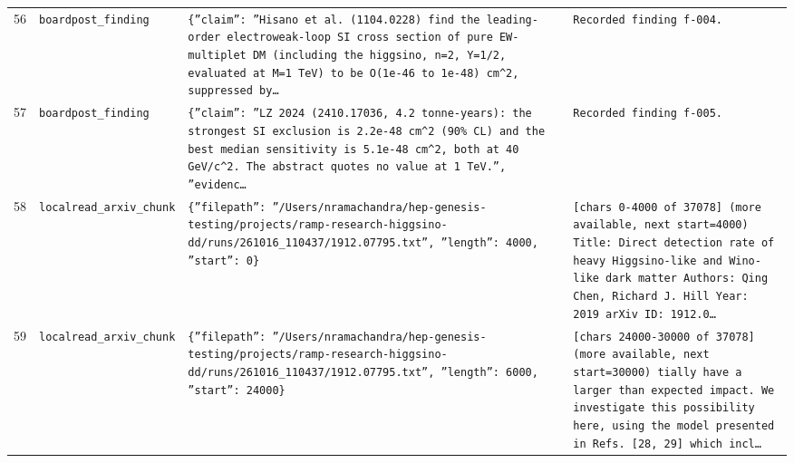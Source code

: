 \documentclass[11pt,a4paper]{article}
\begin{document}
\begin{longtable}{@{}p{}p{}p{}p{}@{}}
56 & \texttt{board}\newline\texttt{post\_\allowbreak{}finding} & \texttt{\{''claim'':\allowbreak{} ''Hisano et al. (1104.0228)\allowbreak{} find the leading-order electroweak-loop SI cross section of pure EW-multiplet DM (including the higgsino,\allowbreak{} n=\allowbreak{}2,\allowbreak{} Y=\allowbreak{}1/\allowbreak{}2,\allowbreak{} evaluated at M=\allowbreak{}1 TeV)\allowbreak{} to be O(1e-46 to 1e-48)\allowbreak{} cm\textasciicircum{}\allowbreak{}2,\allowbreak{} suppressed by\ldots{}\allowbreak{}} & \texttt{Recorded finding f-004.} \\
57 & \texttt{board}\newline\texttt{post\_\allowbreak{}finding} & \texttt{\{''claim'':\allowbreak{} ''LZ 2024 (2410.17036,\allowbreak{} 4.2 tonne-years)\allowbreak{}:\allowbreak{} the strongest SI exclusion is 2.2e-48 cm\textasciicircum{}\allowbreak{}2 (90\% CL)\allowbreak{} and the best median sensitivity is 5.1e-48 cm\textasciicircum{}\allowbreak{}2,\allowbreak{} both at 40 GeV/\allowbreak{}c\textasciicircum{}\allowbreak{}2. The abstract quotes no value at 1 TeV.'',\allowbreak{} ''evidenc\ldots{}\allowbreak{}} & \texttt{Recorded finding f-005.} \\
58 & \texttt{local}\newline\texttt{read\_\allowbreak{}arxiv\_\allowbreak{}chunk} & \texttt{\{''filepath'':\allowbreak{} ''/\allowbreak{}Users/\allowbreak{}nramachandra/\allowbreak{}hep-genesis-testing/\allowbreak{}projects/\allowbreak{}ramp-research-higgsino-dd/\allowbreak{}runs/\allowbreak{}261016\_\allowbreak{}110437/\allowbreak{}1912.07795.txt'',\allowbreak{} ''length'':\allowbreak{} 4000,\allowbreak{} ''start'':\allowbreak{} 0\}\allowbreak{}} & \texttt{[chars 0-4000 of 37078]\allowbreak{} (more available,\allowbreak{} next start=\allowbreak{}4000)\allowbreak{}  Title:\allowbreak{} Direct detection rate of heavy Higgsino-like and Wino-like dark matter Authors:\allowbreak{} Qing Chen,\allowbreak{} Richard J. Hill Year:\allowbreak{} 2019 arXiv ID:\allowbreak{} 1912.0\ldots{}\allowbreak{}} \\
59 & \texttt{local}\newline\texttt{read\_\allowbreak{}arxiv\_\allowbreak{}chunk} & \texttt{\{''filepath'':\allowbreak{} ''/\allowbreak{}Users/\allowbreak{}nramachandra/\allowbreak{}hep-genesis-testing/\allowbreak{}projects/\allowbreak{}ramp-research-higgsino-dd/\allowbreak{}runs/\allowbreak{}261016\_\allowbreak{}110437/\allowbreak{}1912.07795.txt'',\allowbreak{} ''length'':\allowbreak{} 6000,\allowbreak{} ''start'':\allowbreak{} 24000\}\allowbreak{}} & \texttt{[chars 24000-30000 of 37078]\allowbreak{} (more available,\allowbreak{} next start=\allowbreak{}30000)\allowbreak{}  tially have a larger than expected impact. We investigate this possibility here,\allowbreak{} using the model presented in Refs. [28,\allowbreak{} 29]\allowbreak{} which incl\ldots{}\allowbreak{}} \\

\end{longtable}
\end{document}
